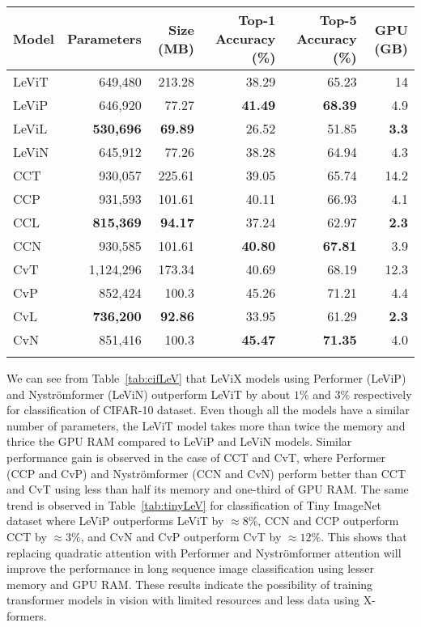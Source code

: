 \documentclass{article}
\begin{document}
 
\begin{table*}[h]
\centering
\begin{tabular}{lrrrrr}
\hline
\textbf{Model} & \textbf{Parameters} & \textbf{Size (MB)} & \textbf{Top-1 Accuracy (\%)} & \textbf{Top-5 Accuracy (\%)} & \textbf{GPU (GB)} \\ \hline
LeViT & 649,480 & 213.28 & 38.29 & 65.23 & 14 \\
LeViP & 646,920 & 77.27 & \textbf{41.49} & \textbf{68.39} & 4.9 \\
LeViL & \textbf{530,696} & \textbf{69.89} & 26.52 & 51.85 & \textbf{3.3} \\
LeViN & 645,912 & 77.26 & 38.28 & 64.94 & 4.3 \\
\hline
CCT & 930,057 & 225.61 & 39.05 & 65.74 & 14.2 \\
CCP & 931,593 & 101.61 & 40.11 & 66.93 & 4.1 \\
CCL & \textbf{815,369} & \textbf{94.17} & 37.24 & 62.97 & \textbf{2.3} \\
CCN & 930,585 & 101.61 & \textbf{40.80} & \textbf{67.81} & 3.9 \\
\hline
CvT & 1,124,296 & 173.34 & 40.69 & 68.19 & 12.3 \\
CvP & 852,424 & 100.3 & 45.26 & 71.21 & 4.4 \\
CvL & \textbf{736,200} & \textbf{92.86} & 33.95 & 61.29 & \textbf{2.3} \\
CvN & 851,416 & 100.3 & \textbf{45.47} & \textbf{71.35} & 4.0 \\
\hline \\
\end{tabular}\caption{Comparison of different convolutional transformers without and with linear attention mechanisms on Tiny ImageNet dataset}
\label{tab:tinyLeV}
\end{table*}




We can see from Table~\ref{tab:cifLeV} that LeViX models using Performer (LeViP) and Nyströmformer (LeViN) outperform LeViT by about $1\%$ and $3\%$ respectively for classification of CIFAR-10 dataset. Even though all the models have a similar number of parameters, the LeViT model takes more than twice the memory and thrice the GPU RAM compared to LeViP and LeViN models. Similar performance gain is observed in the case of CCT and CvT, where Performer (CCP and CvP) and Nyströmformer (CCN and CvN) perform better than CCT and CvT using less than half its memory and one-third of GPU RAM. The same trend is observed in Table~\ref{tab:tinyLeV} for classification of Tiny ImageNet dataset where LeViP outperforms LeViT by $\approx 8\%$, CCN and CCP outperform CCT by $\approx 3\%$, and CvN and CvP outperform CvT by $\approx 12\%$. This shows that replacing quadratic attention with Performer and Nyströmformer attention will improve the performance in long sequence image classification using lesser memory and GPU RAM. These results indicate the possibility of training transformer models in vision with limited resources and less data using X-formers.
\end{document}
